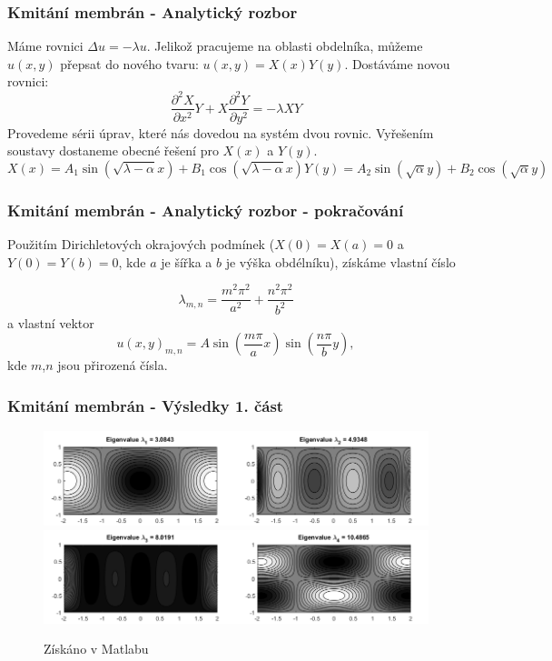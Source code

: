 \documentclass{beamer}
\begin{document}
\begin{frame}
\frametitle{Kmitání membrán - Analytický rozbor}
\pause
Máme rovnici $\Delta u=-\lambda u$. Jelikož pracujeme na oblasti obdelníka, můžeme $u(x,y)$ přepsat do nového tvaru: $u(x,y)=X(x) Y(y)$.
\pause
Dostáváme novou rovnici:
\begin{equation}
   \frac{\partial^2 X}{\partial x^2} Y
      + X \frac{\partial^2 Y}{\partial y^2}=-\lambda X Y
\end{equation}
\pause
Provedeme sérii úprav, které nás dovedou na systém dvou rovnic. Vyřešením soustavy dostaneme obecné řešení pro $X(x)$ a $Y(y)$.
\pause
\begin{subequations} 
\begin{equation}
X(x)=A_1 \sin{(\sqrt{\lambda-\alpha}x)}+B_1 \cos{(\sqrt{\lambda-\alpha}x)}
\end{equation}
\begin{equation}
Y(y)=A_2 \sin{(\sqrt{\alpha}y)}+B_2 \cos{(\sqrt{\alpha}y)}
\end{equation}
\end{subequations}

\end{frame}

\begin{frame}
\frametitle{Kmitání membrán - Analytický rozbor - pokračování}
Použitím Dirichletových okrajových podmínek ($X(0)=X(a)=0$ a $Y(0)=Y(b)=0$, kde $a$ je šířka a $b$ je výška obdélníku), získáme vlastní číslo

\begin{equation}
\lambda_{m,n}=\frac{m^2\pi^2}{a^2}+\frac{n^2\pi^2}{b^2}
\end{equation}
\pause
a vlastní vektor
\begin{equation}
u(x,y)_{m,n}=A\sin{(\frac{m\pi}{a}x)}\sin{(\frac{n\pi}{b}y)},
\end{equation}
kde $m$,$n$ jsou přirozená čísla.
\end{frame}



\begin{frame}
\frametitle{Kmitání membrán - Výsledky 1. část}
\centering
\begin{figure}
\includegraphics[width=1\linewidth]{obdelnicky1.png}
\includegraphics[width=1\linewidth]{obdelnicky2.png}
\caption{Získáno v Matlabu}
\end{figure}
\end{frame}
\end{document}
